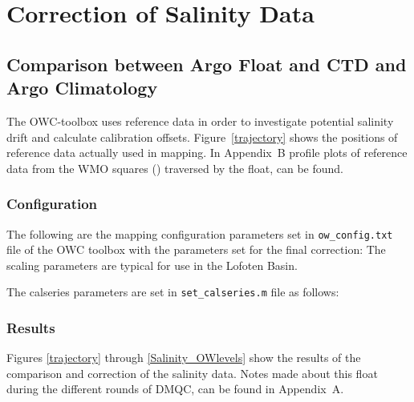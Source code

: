 \documentclass{article}
\begin{document}
\newpage
\section{Correction of Salinity Data}


\subsection{Comparison between Argo Float and CTD and Argo Climatology} 
%
The OWC-toolbox uses reference data in order to investigate potential
salinity drift and calculate calibration offsets. Figure~\ref{trajectory}
shows the positions of reference data actually used in mapping. In 
Appendix~B profile plots of reference data from the WMO squares
() traversed by the float, can be found.

\subsubsection{Configuration}\label{Configuration1}
%  
The following are the mapping configuration parameters set in
\texttt{ow\_config.txt} file of the OWC toolbox with the parameters set
for the final correction:  
The scaling parameters are typical for use in the Lofoten Basin. %

The calseries parameters are set in \texttt{set\_calseries.m} file as
follows: 


\subsubsection{Results}\label{results_CTDArgo}
Figures \ref{trajectory} through \ref{Salinity_OWlevels} show the results
of the comparison and correction of the salinity data.
%
Notes made about this float during the different rounds of DMQC, can be
found in Appendix~A.
\end{document}
